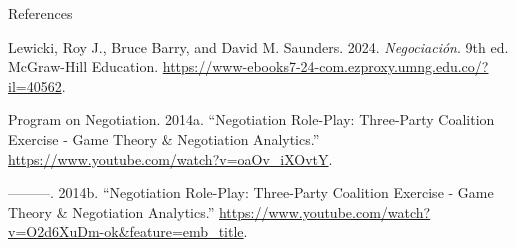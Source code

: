 \documentclass[
  ignorenonframetext,
]{beamer}
\newlength{\cslhangindent}
\newenvironment{CSLReferences}[2] %
 {\begin{list}{}{%
  \setlength{\itemindent}{0pt}
  \setlength{\leftmargin}{0pt}
  \setlength{\parsep}{0pt}
  \ifodd #1
   \setlength{\leftmargin}{\cslhangindent}
   \setlength{\itemindent}{-1\cslhangindent}
  \fi
  \setlength{\itemsep}{#2\baselineskip}}}
 {\end{list}}
\begin{document}
\begin{frame}{References}
\label{refs}
\begin{CSLReferences}{1}{0}
Lewicki, Roy J., Bruce Barry, and David M. Saunders. 2024.
\emph{Negociación}. 9th ed. McGraw-Hill Education.
\url{https://www-ebooks7-24-com.ezproxy.umng.edu.co/?il=40562}.

Program on Negotiation. 2014a. {``Negotiation {Role}-{Play}:
{Three}-{Party} {Coalition} {Exercise} - {Game} {Theory} \&
{Negotiation} {Analytics}.''}
\url{https://www.youtube.com/watch?v=oaOv_iXOvtY}.

---------. 2014b. {``Negotiation {Role}-{Play}: {Three}-{Party}
{Coalition} {Exercise} - {Game} {Theory} \& {Negotiation}
{Analytics}.''}
\url{https://www.youtube.com/watch?v=O2d6XuDm-ok&feature=emb_title}.

\end{CSLReferences}
\end{frame}
\end{document}
